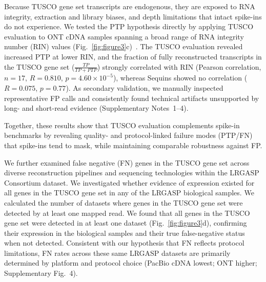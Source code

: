 \documentclass[pdflatex,sn-nature]{sn-jnl}%
\newcommand{\tuscoGeneSet}{TUSCO gene set}
\newcommand{\tuscoEvaluation}{TUSCO evaluation}
\begin{document}
Because \tuscoGeneSet{} transcripts are endogenous, they are exposed to RNA integrity, extraction and library biases, and depth limitations that intact spike-ins do not experience. We tested the PTP hypothesis directly by applying \tuscoEvaluation{} to ONT cDNA samples spanning a broad range of RNA integrity number (RIN) values (Fig.~\ref{fig:figure3}c)~\cite{prawer_pervasive_2023}. The \tuscoEvaluation{} revealed increased PTP at lower RIN, and the fraction of fully reconstructed transcripts in the \tuscoGeneSet{} ($\frac{TP}{TP + PTP}$) strongly correlated with RIN (Pearson correlation, $n = 17$, $R = 0.810$, $p = 4.60 \times 10^{-5}$), whereas Sequins showed no correlation ($R = 0.075$, $p = 0.77$). As secondary validation, we manually inspected representative FP calls and consistently found technical artifacts unsupported by long- and short-read evidence (Supplementary Notes~1--4).

Together, these results show that \tuscoEvaluation{} complements spike-in benchmarks by revealing quality- and protocol-linked failure modes (PTP/FN) that spike-ins tend to mask, while maintaining comparable robustness against FP.

We further examined false negative (FN) genes in the \tuscoGeneSet{} across diverse reconstruction pipelines and sequencing technologies within the LRGASP Consortium dataset. We investigated whether evidence of expression existed for all genes in the \tuscoGeneSet{} in any of the LRGASP biological samples. We calculated the number of datasets where genes in the \tuscoGeneSet{} were detected by at least one mapped read. We found that all genes in the \tuscoGeneSet{} were detected in at least one dataset (Fig.~\ref{fig:figure3}d), confirming their expression in the biological samples and their true false-negative status when not detected. Consistent with our hypothesis that FN reflects protocol limitations, FN rates across these same LRGASP datasets are primarily determined by platform and protocol choice (PacBio cDNA lowest; ONT higher; Supplementary Fig.~4).
\end{document}
